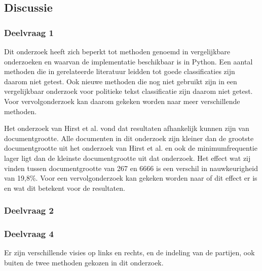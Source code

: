 \subsection{Discussie}
\subsubsection{Deelvraag 1}

Dit onderzoek heeft zich beperkt tot methoden genoemd in vergelijkbare onderzoeken en waarvan de implementatie beschikbaar is in Python. Een aantal methoden die in gerelateerde literatuur leidden tot goede classificaties zijn daarom niet getest. Ook nieuwe methoden die nog niet gebruikt zijn in een vergelijkbaar onderzoek voor politieke tekst classificatie zijn daarom niet getest. Voor vervolgonderzoek kan daarom gekeken worden naar meer verschillende methoden.\par
Het onderzoek van Hirst et al. vond dat resultaten afhankelijk kunnen zijn van documentgrootte. Alle documenten in dit onderzoek zijn kleiner dan de grootste documentgrootte uit het onderzoek van Hirst et al. en ook de minimumfrequentie lager ligt dan de kleinste documentgrootte uit dat onderzoek.
Het effect wat zij vinden tussen documentgrootte van 267 en 6666 is een verschil in nauwkeurigheid van 19,8\%. Voor een vervolgonderzoek kan gekeken worden naar of dit effect er is en wat dit betekent voor de resultaten.\par

\subsubsection{Deelvraag 2}


\subsubsection{Deelvraag 4}
Er zijn verschillende visies op links en rechts, en de indeling van de partijen, ook buiten de twee methoden gekozen in dit onderzoek.\par
